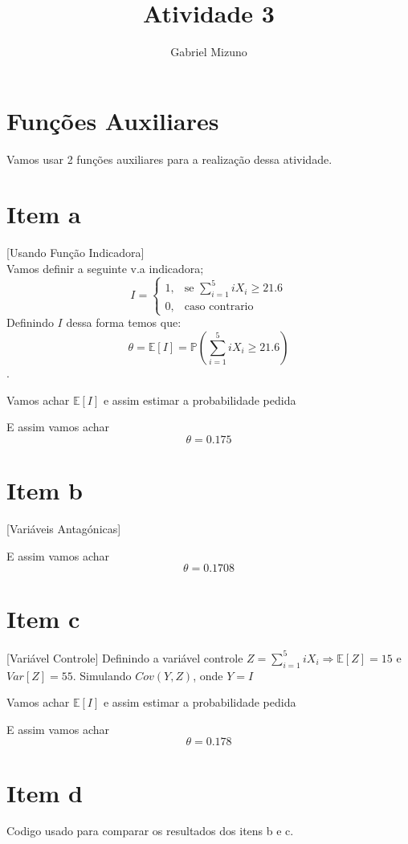 \documentclass[11pt,a4paper]{article}
\title{Atividade 3}
\author{Gabriel Mizuno}
\begin{document}
\maketitle

\section*{Funções Auxiliares}
Vamos usar 2 funções auxiliares para a realização dessa atividade.


\section{Item a}[Usando Função Indicadora] \\
Vamos definir a seguinte v.a indicadora;$$I=\begin{cases} 1, & \mbox{se } \displaystyle\sum_{i=1}^5 iX_{i}\geqslant21.6\\ 0, & \mbox{caso contrario}\end{cases}$$  
Definindo $I$ dessa forma temos que:
$$\theta=\mathbb{E}[I]=\mathbb{P}\left( \displaystyle\sum_{i=1}^5 iX_{i}\geqslant21.6\right) $$.
\newpage


Vamos achar $\mathbb{E}[I]$ e assim estimar a probabilidade pedida


E assim vamos achar $$\theta=0.175 $$
\section{Item b}[Variáveis Antagónicas]

E assim vamos achar $$\theta=0.1708 $$
\newpage
\section{Item c}[Variável Controle]
Definindo a variável controle $Z=\displaystyle\sum_{i=1}^5 iX_{i} \Rightarrow \mathbb{E}[Z]=15$ e $Var[Z]=55$.
Simulando $Cov(Y,Z)$, onde $Y=I$



Vamos achar $\mathbb{E}[I]$ e assim estimar a probabilidade pedida


E assim vamos achar $$\theta=0.178 $$
\section{Item d}
Codigo usado para comparar os resultados dos itens b e c.

\end{document}
